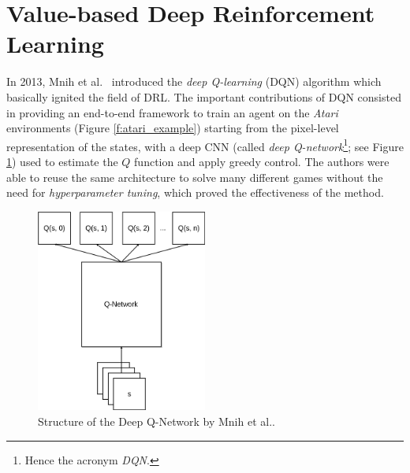 \section{Value-based Deep Reinforcement Learning} \label{SOA:value}
In 2013, Mnih et al.\ \cite{mnih2015human} introduced the \textit{deep 
Q-learning} (DQN) algorithm which basically ignited the field of DRL.
The important contributions of DQN consisted in providing an end-to-end 
framework to train an agent on the \textit{Atari} environments (Figure \ref{f:atari_example})
starting from the pixel-level representation of the states, with a deep CNN 
(called \textit{deep Q-network}\footnote{Hence the acronym \textit{DQN}.}; see 
Figure \ref{f:dqn_mnih}) used to estimate the $Q$ function and apply greedy 
control. 
The authors were able to reuse the same architecture to solve many different 
games without the need for \textit{hyperparameter tuning}, which proved the 
effectiveness of the method.
%
\begin{figure}[h]
    \includegraphics[width=0.5\textwidth]{pictures/dqn}
    \centering
    \caption[Structure of the Deep Q-Network by Mnih et al.\ ]{Structure of the 
	    Deep Q-Network by Mnih et al..}
    \label{f:dqn_mnih}
\end{figure}
%

